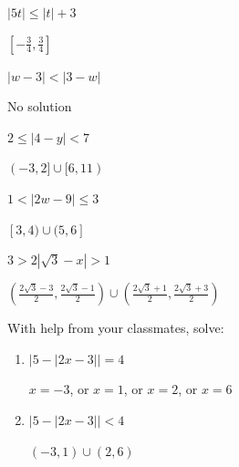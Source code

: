 \documentclass{ximera}
\begin{document}
\begin{question}
\begin{problem}
$|5t| \leq |t|+3$

\begin{solution}
    $\left[ -\frac{3}{4}, \frac{3}{4}\right]$
\end{solution}
\end{problem}

\begin{problem}
$|w-3| < |3-w|$

\begin{solution}
    No solution
\end{solution}
\end{problem}

\begin{problem}
$2 \leq |4-y| < 7$

\begin{solution}
     $(-3,2] \cup [6,11)$
\end{solution}
\end{problem}

\begin{problem}
$1 < |2w - 9| \leq 3$

\begin{solution}
     $[3, 4) \cup (5, 6]$
\end{solution}
\end{problem}

\begin{problem} \label{solveinequabsquadlast}
$3 > 2|\sqrt{3} - x| > 1$ 

\begin{solution}
    $\left(\frac{2 \sqrt{3} - 3}{2},  \frac{2 \sqrt{3} - 1}{2}   \right) \cup \left(\frac{2 \sqrt{3} +1}{2},  \frac{2 \sqrt{3} +3}{2}   \right)$
\end{solution}
\end{problem}

\end{question}

\begin{problem}
With help from your classmates, solve:
\begin{enumerate}
\item  $|5 - |2x-3|| = 4$

\begin{solution}
    $x = -3$, or $x = 1$, or $x = 2$, or $x = 6$
\end{solution}

\item   $|5 - |2x-3|| < 4$

\begin{solution}
    $(-3,1) \cup (2,6)$
\end{solution}
 
\end{enumerate}
\end{problem}
\end{document}
